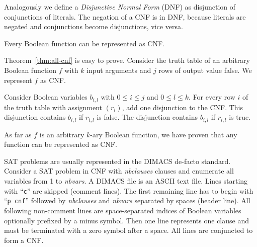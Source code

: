 Analogously we define a \emph{Disjunctive Normal Form} (DNF) as disjunction
of conjunctions of literals. The negation of a CNF is in DNF, because literals
are negated and conjunctions become disjunctions, vice versa.

\begin{theorem}
  \label{thm:all-cnf}
  Every Boolean function can be represented as CNF.
\end{theorem}

Theorem~\ref{thm:all-cnf} is easy to prove.
%
Consider the truth table of an arbitrary Boolean function $f$ with $k$ input arguments
and $j$ rows of output value false. We represent $f$ as CNF.

Consider Boolean variables $b_{i,l}$ with $0 \leq i \leq j$ and $0 \leq l \leq k$.
For every row $i$ of the truth table with assignment $(r_i)$, add one disjunction to the CNF.
This disjunction contains $b_{i,l}$ if $r_{i,l}$ is false.
The disjunction contains $b_{i,l}$ if $r_{i,l}$ is true.

As far as $f$ is an arbitrary $k$-ary Boolean function, we have proven that
any function can be represented as CNF.

SAT problems are usually represented in the DIMACS de-facto standard.
Consider a SAT problem in CNF with \emph{nbclauses} clauses and
enumerate all variables from 1 to \emph{nbvars}. A DIMACS file is an ASCII text
file. Lines starting with \enquote{\texttt{c}} are skipped (comment lines).
The first remaining line has to begin with \enquote{\texttt{p cnf}} followed by
\emph{nbclauses} and \emph{nbvars} separated by spaces (header line).
All following non-comment lines are space-separated indices of Boolean variables
optionally prefixed by a minus symbol. Then one line represents one clause and
must be terminated with a zero symbol after a space. All lines are conjuncted
to form a CNF.

